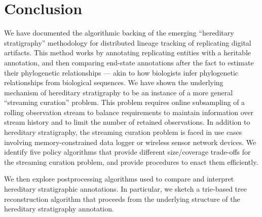 \section{Conclusion} \label{sec:conclusion}

We have documented the algorithmic backing of the emerging ``hereditary stratigraphy'' methodology for distributed lineage tracking of replicating digital artifacts.
This method works by annotating replicating entities with a heritable annotation, and then comparing end-state annotations after the fact to estimate their phylogenetic relationships --- akin to how biologists infer phylogenetic relationships from biological sequences.
We have shown the underlying mechanism of hereditary stratigraphy to be an instance of a more general ``streaming curation'' problem.
This problem requires online subsampling of a rolling observation stream to balance requirements to maintain information over stream history and to limit the number of retained observations.
In addition to hereditary stratigraphy, the streaming curation problem is faced in use cases involving memory-constrained data logger or wireless sensor network devices.
We identify five policy algorithms that provide different size/coverage trade-offs for the streaming curation problem, and provide procedures to enact them efficiently.

We then explore postprocessing algorithms used to compare and interpret hereditary stratigraphic annotations.
In particular, we sketch a trie-based tree reconstruction algorithm that proceeds from the underlying structure of the hereditary stratigraphy annotation.

